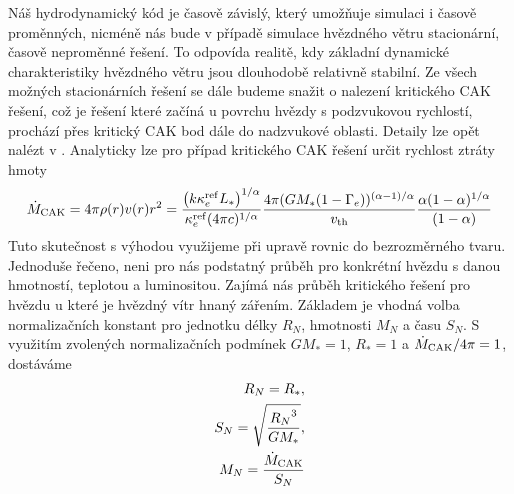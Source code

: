 Náš hydrodynamický kód je časově závislý, který umožňuje simulaci i časově proměnných, nicméně nás bude v případě simulace hvězdného větru stacionární, časově neproměnné řešení. To odpovída realitě, kdy základní dynamické charakteristiky hvězdného větru jsou dlouhodobě relativně stabilní. Ze všech možných stacionárních řešení se dále budeme snažit o nalezení kritického CAK řešení, což je řešení které začíná u povrchu hvězdy s podzvukovou rychlostí, prochází přes kritický CAK bod dále do nadzvukové oblasti. Detaily lze opět nalézt v \citep{Lamers}. Analyticky lze pro případ kritického CAK řešení určit rychlost ztráty hmoty
\begin{equation}
\dot{M}_{\rm CAK} = 4\pi\rho(r)v(r)r^2 = \frac{\left(k \kappa_e^{\rm ref}L_*\right)^{1/\alpha}}{\kappa_e^{\rm ref}(4\pi c)^{1/\alpha}}\frac{4\pi(GM_*(1-\Gamma_e))^{(\alpha-1)/\alpha}}{v_{\rm th}}\frac{\alpha(1-\alpha)^{1/\alpha}}{(1-\alpha)}
\end{equation}
Tuto skutečnost s výhodou využijeme při upravě rovnic do bezrozměrného tvaru. Jednoduše řečeno, neni pro nás podstatný průběh pro konkrétní hvězdu s danou hmotností, teplotou a luminositou. Zajímá nás průběh kritického řešení pro hvězdu u které je hvězdný vítr hnaný zářením. Základem je vhodná volba normalizačních konstant pro jednotku délky $R_{N}$, hmotnosti $M_{N}$ a času $S_N$. S využitím zvolených normalizačních podmínek $GM_*=1$, $R_* = 1$ a $\dot{M}_{\rm CAK}/4\pi = 1$, dostáváme 
\begin{eqnarray}
R_{N} = R_*, \\
S_{N} = \sqrt{\frac{{R_N}^3}{GM_*}},\\
M_{N} = \frac{\dot{M}_{\rm CAK}}{S_N}
\end{eqnarray}
